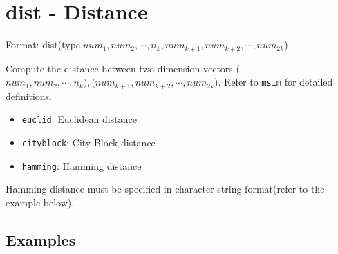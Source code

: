
%

\section{dist - Distance\label{sect:dist}}

Format: dist(type,$num_1,num_2,\cdots,n_k,num_{k+1},num_{k+2},\cdots,num_{2k}$)

Compute the distance between two dimension vectors ($num_1,num_2,\cdots,n_k),(num_{k+1},num_{k+2},\cdots,num_{2k}$). Refer to \verb|msim| for detailed definitions.


\begin{itemize}
\item \verb|euclid|: Euclidean distance 
\item \verb|cityblock|: City Block distance 
\item \verb|hamming|: Hamming distance
\end{itemize}


Hamming distance must be specified in character string format(refer to the example below). 

\subsection*{Examples}


%

